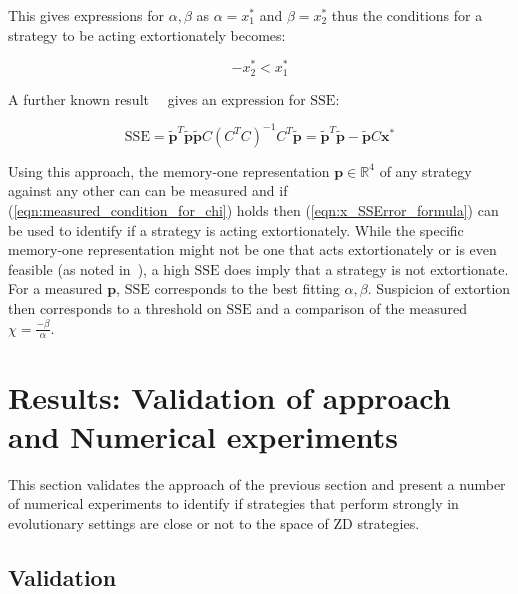 \documentclass[a4paper]{article}
\newcommand{\SSe}{\text{SSE}}
\begin{document}
This gives expressions for \(\alpha, \beta\) as \(\alpha=x^*_1\) and
\(\beta=x^*_2\) thus the conditions for a strategy to be acting extortionately
becomes:

\begin{equation}
    -x^*_2 < x^*_1 \label{eqn:measured_condition_for_chi}
\end{equation}

A further known result~~\cite{kutner2004applied, rao1973linear,
wakefield2013bayesian} gives an expression for
\(\SSe\):

\begin{equation}\label{eqn:x_SSError_formula}
    \SSe = {\tilde{\textbf{p}}} ^ T \tilde{\textbf{p}}
           \tilde{\textbf{p}} C \left(C ^ T C \right) ^ {-1} C ^ T
           \tilde{\textbf{p}} = {\tilde{\textbf{p}}} ^ T \tilde{\textbf{p}} - \tilde{\textbf{p}} C \textbf{x}^*
\end{equation}

Using this approach, the memory-one representation \(\textbf{p}\in\mathbb{R}^4\) of any
strategy against any other can can be measured and if
(\ref{eqn:measured_condition_for_chi}) holds then (\ref{eqn:x_SSError_formula})
can be used to identify if a strategy is acting extortionately. While the
specific memory-one representation might not be one that acts extortionately or
is even feasible (as noted in~\cite{Press2012}), a
high \(\SSe\) does imply that a strategy is not extortionate. For a measured
\(\textbf{p}\), \(\SSe\) corresponds to the best fitting \(\alpha, \beta\). Suspicion of
extortion then corresponds to a threshold on \(\SSe\) and a comparison of the
measured \(\chi=\frac{-\beta}{\alpha}\).

\section{Results: Validation of approach and Numerical experiments}\label{sec:numerical-experiments}

This section validates the approach of the previous section and
present a number of numerical experiments to identify if strategies that perform
strongly in evolutionary settings are close or not to the space of
ZD strategies.

\subsection{Validation}
\end{document}
